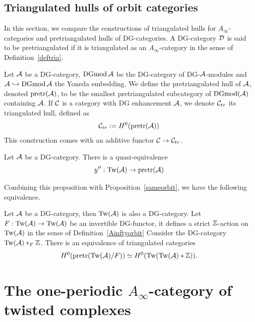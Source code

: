 \documentclass[12pt]{article}
\begin{document}
	\subsection{Triangulated hulls of orbit categories}
	
	In this section, we compare the constructions of triangulated hulls for $A_\infty$-categories and pretriangulated hulls of DG-categories. A DG-category ${\cal{D}}$ is said to be pretriangulated if it is triangulated as an $A_\infty$-category in the sense of Definition~\ref{deftria}. 
	
	\begin{definition}{\cite[Section 5.4]{KelOrb}}
		Let ${\cal{A}}$ be a DG-category, $\textup{DGmod} \, {\cal{A}}$ be the DG-category of DG-${\cal{A}}$-modules and ${\cal{A}} \hookrightarrow \textup{DGmod} \, {\cal{A}}$ the Yoneda embedding. We define the pretriangulated hull of ${\cal{A}}$, denoted $\textup{pretr}({\cal{A}})$, to be the smallest pretriangulated subcategory of $\textup{DGmod}({\cal{A}})$ containing ${\cal{A}}$. 
		If ${\cal{C}}$ is a category with DG enhancement ${\cal{A}}$, we denote ${\cal{C}}_{tr}$ its triangulated hull, defined as 
		\[{\cal{C}}_{tr}:= H^0(\textup{pretr}({\cal{A}}))\]
		This construction comes with an additive functor ${\cal{C}} \to {\cal{C}}_{tr}$.
	\end{definition}
	
	\begin{proposition}{\cite[Section 7.4]{Lef}}
		\label{Kenji}
		Let ${\cal{A}}$ be a DG-category. There is a quasi-equivalence
		\[y'':\textup{Tw}({\cal{A}}) \to \textup{pretr}({\cal{A}})\]
	\end{proposition}
	
	Combining this proposition with Proposition~\ref{sameorbit}, we have the following equivalence.
	
	\begin{corollary}
		\label{pretrequiv}
		Let ${\cal{A}}$ be a DG-category, then $\textup{Tw}({\cal{A}})$ is also a DG-category. Let $F: \textup{Tw}({\cal{A}}) \to \textup{Tw}({\cal{A}})$ be an invertible DG-functor, it defines a strict $\mathbb{Z}$-action on $\textup{Tw}({\cal{A}})$ in the sense of Definition~\ref{Ainftyorbit} Consider the DG-category $\textup{Tw}({\cal{A}}) *_F \mathbb{Z}$. There is an equivalence of triangulated categories
		\[H^0(\textup{pretr}(\textup{Tw}({\cal{A}}) /F)) \simeq H^0(\textup{Tw}(\textup{Tw}({\cal{A}}) * \mathbb{Z})).\]
	\end{corollary}
	
	\section{The one-periodic $A_\infty$-category of twisted complexes}
	
\end{document}
